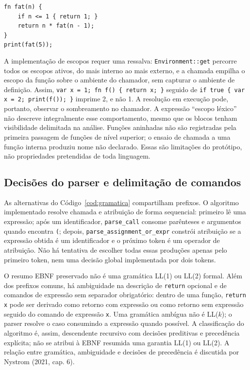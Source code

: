 \begin{codigo}[htb]
\begin{lstlisting}[language={}]
fn fat(n) {
    if n <= 1 { return 1; }
    return n * fat(n - 1);
}
print(fat(5));
\end{lstlisting}
\end{codigo}
\FloatBarrier

A implementação de escopos requer uma ressalva: \texttt{Environment::get}
percorre todos os escopos ativos, do mais interno ao mais externo, e a chamada
empilha o escopo da função sobre o ambiente do chamador, sem capturar o ambiente
de definição. Assim, \texttt{var x = 1; fn f() \{ return x; \}}
seguido de \texttt{if true \{ var x = 2; print(f()); \}} imprime 2,
e não 1. A resolução em execução pode, portanto, observar o sombreamento no
chamador. A expressão ``escopo léxico'' não descreve integralmente esse
comportamento, mesmo que os blocos tenham visibilidade delimitada na análise.
Funções aninhadas não são registradas pela primeira passagem de funções de nível
superior; o ensaio de chamada a uma função interna produziu nome não declarado.
Essas são limitações do protótipo, não propriedades pretendidas de toda linguagem.

\subsection{Decisões do parser e delimitação de comandos}
\label{sec:decisoes_parser}

As alternativas do Código~\ref{cod:gramatica} compartilham prefixos. O algoritmo
implementado resolve chamada e atribuição de forma sequencial: primeiro lê uma
expressão; após um identificador, \texttt{parse\_call} consome parênteses e argumentos
quando encontra \texttt{(}; depois, \texttt{parse\_assignment\_or\_expr} constrói
atribuição se a expressão obtida é um identificador e o próximo token é um
operador de atribuição. Não há tentativa de escolher todas essas produções
apenas pelo primeiro token, nem uma decisão global implementada por dois tokens.

O resumo EBNF preservado não é uma gramática LL(1) ou LL(2) formal. Além dos
prefixos comuns, há ambiguidade na descrição de \texttt{return} opcional e de
comandos de expressão sem separador obrigatório: dentro de uma função,
\texttt{return x} pode ser derivado como retorno com expressão ou como retorno
sem expressão seguido do comando de expressão \texttt{x}. Uma gramática ambígua
não é LL($k$); o parser resolve o caso consumindo a expressão quando possível.
A classificação do algoritmo é, assim, descendente recursivo com decisões
preditivas e precedência explícita; não se atribui à EBNF resumida uma garantia
LL(1) ou LL(2). A relação entre gramática, ambiguidade e decisões de precedência
é discutida por Nystrom (2021, cap. 6).

